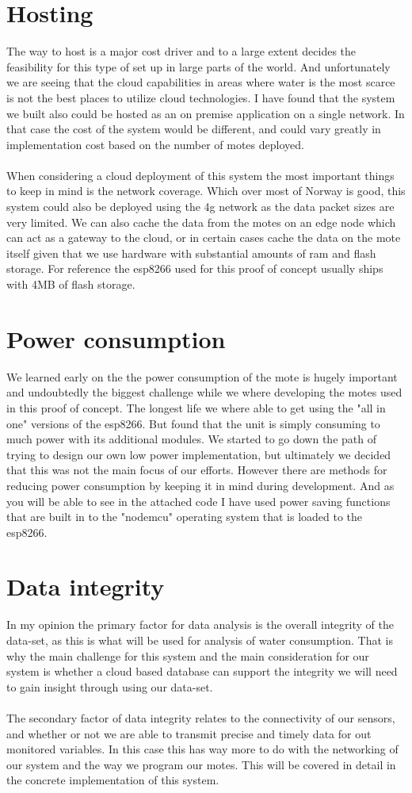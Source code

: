 \documentclass[]{uiophd}
\begin{document}
\section{Hosting}
The way to host is a major cost driver and to a large extent decides the feasibility for this type of set up in large parts of the world. And unfortunately we are seeing that the cloud capabilities in areas where water is the most scarce is not the best places to utilize cloud technologies. I have found that the system we built also could be hosted as an on premise application on a single network. In that case the cost of the system would be different, and could vary greatly in implementation cost based on the number of motes deployed.
\\\\
When considering a cloud deployment of this system the most important things to keep in mind is the network coverage. Which over most of Norway is good, this system could also be deployed using the 4g network as the data packet sizes are very limited. We can also cache the data from the motes on an edge node which can act as a gateway to the cloud, or in certain cases cache the data on the mote itself given that we use hardware with substantial amounts of ram and flash storage. For reference the esp8266 used for this proof of concept usually ships with 4MB of flash storage. \parencite{espressif}
\section{Power consumption}
We learned early on the the power consumption of the mote is hugely important and undoubtedly the biggest challenge while we where developing the motes used in this proof of concept. The longest life we where able to get using the "all in one" versions of the esp8266. But found that the unit is simply consuming to much power with its additional modules. We started to go down the path of trying to design our own low power implementation, but ultimately we decided that this was not the main focus of our efforts. However there are methods for reducing power consumption by keeping it in mind during development. And as you will be able to see in the attached code I have used  power saving functions that are built in to the "nodemcu" operating system that is loaded to the esp8266.
\section{Data integrity}
In my opinion the primary factor for data analysis is the overall integrity of the data-set, as this is what will be used for analysis of water consumption. That is why the main challenge for this system and the main consideration for our system is whether a cloud based database can support the integrity we will need to gain insight through using our data-set. 
\\\\
The secondary factor of data integrity relates to the connectivity of our sensors, and whether or not we are able to transmit precise and timely data for out monitored variables. In this case this has way more to do with the networking of our system and the way we program our motes. This will be covered in detail in the concrete implementation of this system.
\end{document}
